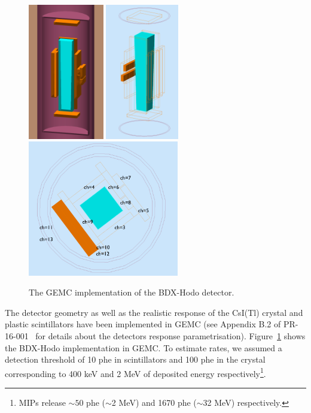 \begin{figure}[h!] 
\center
\includegraphics[width=3.3cm]{figs/gemc-3d.pdf}  
\includegraphics[width=3.2cm]{figs/gemc-3d1.pdf}  
\includegraphics[width=6.6cm]{figs/gemc-3d2.pdf}  
\caption{The GEMC  implementation of the BDX-Hodo detector.}
\label{fig:det-gemc}
\end{figure}


The  detector geometry as well as the realistic response of the CsI(Tl) crystal and plastic scintillators have been implemented in GEMC (see  Appendix B.2 of PR-16-001~\cite{bdx-proposal} for details about the detectors response  parametrisation). 
Figure~\ref{fig:det-gemc} shows the BDX-Hodo implementation in GEMC. 
To estimate rates, we assumed a detection threshold of 10 phe in scintillators and 100 phe in the crystal corresponding to 400 keV and 2 MeV of deposited energy respectively\footnote{MIPs release $\sim50$ phe ($\sim$2 MeV) and 1670 phe ($\sim$32 MeV)  respectively.}. 


